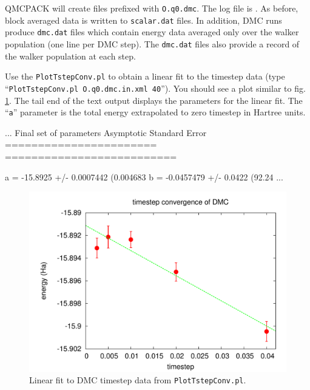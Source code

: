 QMCPACK will create files prefixed with \texttt{O.q0.dmc}.  The log file is .  As before, block averaged data is written to \texttt{scalar.dat} files.  In addition, DMC runs produce \texttt{dmc.dat} files which contain energy data averaged only over the walker population (one line per DMC step).  The \texttt{dmc.dat} files also provide a record of the walker population at each step.

Use the \texttt{PlotTstepConv.pl} to obtain a linear fit to the timestep data (type ``\texttt{PlotTstepConv.pl O.q0.dmc.in.xml 40}'').  You should see a plot similar to fig. \ref{fig:timestep_conv}.  The tail end of the text output displays the parameters for the linear fit.  The ``\texttt{a}'' parameter is the total energy extrapolated to zero timestep in Hartree units. 

\begin{shade}
...
Final set of parameters            Asymptotic Standard Error
=======================            ==========================

a               = -15.8925         +/- 0.0007442    (0.004683%
b               = -0.0457479       +/- 0.0422       (92.24%
...
\end{shade}

\begin{figure}
\begin{center}
\includegraphics[trim = 0mm 0mm 0mm 0mm, clip,width=0.75\columnwidth]{figures/lab_qmc_basics_timestep_conv.pdf}
\end{center}
\caption{Linear fit to DMC timestep data from \texttt{PlotTstepConv.pl}.
\label{fig:timestep_conv}
}
\end{figure}


